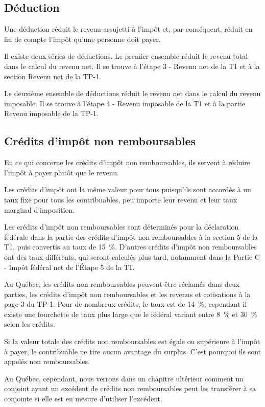 \subsection{Déduction}
Une déduction réduit le revenu assujetti à l'impôt et, par conséquent, réduit en fin de compte l'impôt qu'une personne doit payer.

Il existe deux séries de déductions. Le premier ensemble réduit le revenu total dans le calcul du revenu net. Il se trouve à l'étape 3 - Revenu net de la T1 et à la section \og Revenu net \fg{} de la TP-1. 

Le deuxième ensemble de déductions réduit le revenu net dans le calcul du revenu imposable. Il se trouve à l'étape 4 - Revenu imposable de la T1 et à la partie \og Revenu imposable \fg{} de la TP-1.


\subsection{Crédits d'impôt non remboursables}
En ce qui concerne les crédits d'impôt non remboursables, ils servent à réduire l'impôt à payer plutôt que le revenu. 

Les crédits d'impôt ont la même valeur pour tous puisqu'ils sont accordés à un taux fixe pour tous les contribuables, peu importe leur revenu et leur taux marginal d'imposition. 

Les crédits d'impôt non remboursables sont déterminés pour la déclaration fédérale dans la partie des crédits d'impôt non remboursables à la section 5 de la T1, puis convertis au taux de 15~\%. D'autres crédits d'impôt non remboursables ont des taux différents, qui seront calculés plus tard, notamment dans la Partie C - Impôt fédéral net de l'Étape 5 de la T1.

Au Québec, les crédits non remboursables peuvent être réclamés dans deux parties, les crédits d'impôt non remboursables et les revenus et cotisations à la page 3 du TP-1. Pour de nombreux crédits, le taux est de 14~\%, cependant il existe une fourchette de taux plus large que le fédéral variant entre 8~\% et
30~\% selon les crédits.

Si la valeur totale des crédits non remboursables est égale ou supérieure à l'impôt à payer, le contribuable ne tire aucun avantage du surplus. C'est pourquoi ils sont appelés non remboursables.

Au Québec, cependant, nous verrons dans un chapitre ultérieur comment un conjoint ayant un excédent de crédits non remboursables peut les transférer à sa conjointe si elle est en mesure d'utiliser l'excédent. 


